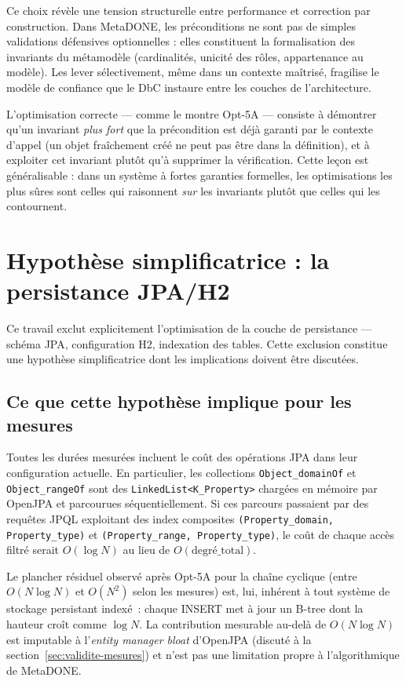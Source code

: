 Ce choix révèle une tension structurelle entre performance et correction par construction. Dans MetaDONE, les préconditions ne sont pas de simples validations défensives optionnelles : elles constituent la formalisation des invariants du métamodèle (cardinalités, unicité des rôles, appartenance au modèle). Les lever sélectivement, même dans un contexte maîtrisé, fragilise le modèle de confiance que le DbC instaure entre les couches de l'architecture.

L'optimisation correcte — comme le montre Opt-5A — consiste à démontrer qu'un invariant \emph{plus fort} que la précondition est déjà garanti par le contexte d'appel (un objet fraîchement créé ne peut pas être dans la définition), et à exploiter cet invariant plutôt qu'à supprimer la vérification. Cette leçon est généralisable : dans un système à fortes garanties formelles, les optimisations les plus sûres sont celles qui raisonnent \emph{sur} les invariants plutôt que celles qui les contournent.

\section{Hypothèse simplificatrice : la persistance JPA/H2}
\label{sec:disc-jpa}

Ce travail exclut explicitement l'optimisation de la couche de persistance — schéma JPA, configuration H2, indexation des tables. Cette exclusion constitue une hypothèse simplificatrice dont les implications doivent être discutées.

\subsection*{Ce que cette hypothèse implique pour les mesures}

Toutes les durées mesurées incluent le coût des opérations JPA dans leur configuration actuelle. En particulier, les collections \texttt{Object\_domainOf} et \texttt{Object\_rangeOf} sont des \texttt{LinkedList<K\_Property>} chargées en mémoire par OpenJPA et parcourues séquentiellement. Si ces parcours passaient par des requêtes JPQL exploitant des index composites \texttt{(Property\_domain, Property\_type)} et \texttt{(Property\_range, Property\_type)}, le coût de chaque accès filtré serait $O(\log N)$ au lieu de $O(\text{degré\_total})$.

Le plancher résiduel observé après Opt-5A pour la chaîne cyclique (entre $O(N \log N)$ et $O(N^2)$ selon les mesures) est, lui, inhérent à tout système de stockage persistant indexé~: chaque INSERT met à jour un B-tree dont la hauteur croît comme $\log N$. La contribution mesurable au-delà de $O(N \log N)$ est imputable à l'\emph{entity manager bloat} d'OpenJPA (discuté à la section~\ref{sec:validite-mesures}) et n'est pas une limitation propre à l'algorithmique de MetaDONE.

